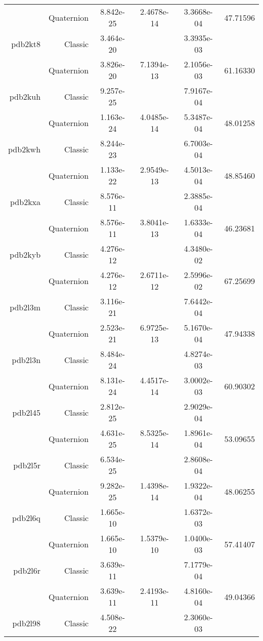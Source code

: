 \begin{xltabular}{\textwidth}{r|rS[table-format=1.3e+2]S[table-format=1.4e+2]S[table-format=1.4e+2]S[table-format=-1.5]}
& Quaternion & 8.842e-25 & 2.4678e-14 & 3.3668e-04 & 47.71596\\  \addlinespace
pdb2kt8 & Classic & 3.464e-20 &  & 3.3935e-03 & \\
& Quaternion & 3.826e-20 & 7.1394e-13 & 2.1056e-03 & 61.16330\\  \addlinespace
pdb2kuh & Classic & 9.257e-25 &  & 7.9167e-04 & \\
& Quaternion & 1.163e-24 & 4.0485e-14 & 5.3487e-04 & 48.01258\\  \addlinespace
pdb2kwh & Classic & 8.244e-23 &  & 6.7003e-04 & \\
& Quaternion & 1.133e-22 & 2.9549e-13 & 4.5013e-04 & 48.85460\\  \addlinespace
pdb2kxa & Classic & 8.576e-11 &  & 2.3885e-04 & \\
& Quaternion & 8.576e-11 & 3.8041e-13 & 1.6333e-04 & 46.23681\\  \addlinespace
pdb2kyb & Classic & 4.276e-12 &  & 4.3480e-02 & \\
& Quaternion & 4.276e-12 & 2.6711e-12 & 2.5996e-02 & 67.25699\\  \addlinespace
pdb2l3m & Classic & 3.116e-21 &  & 7.6442e-04 & \\
& Quaternion & 2.523e-21 & 6.9725e-13 & 5.1670e-04 & 47.94338\\  \addlinespace
pdb2l3n & Classic & 8.484e-24 &  & 4.8274e-03 & \\
& Quaternion & 8.131e-24 & 4.4517e-14 & 3.0002e-03 & 60.90302\\  \addlinespace
pdb2l45 & Classic & 2.812e-25 &  & 2.9029e-04 & \\
& Quaternion & 4.631e-25 & 8.5325e-14 & 1.8961e-04 & 53.09655\\  \addlinespace
pdb2l5r & Classic & 6.534e-25 &  & 2.8608e-04 & \\
& Quaternion & 9.282e-25 & 1.4398e-14 & 1.9322e-04 & 48.06255\\  \addlinespace
pdb2l6q & Classic & 1.665e-10 &  & 1.6372e-03 & \\
& Quaternion & 1.665e-10 & 1.5379e-10 & 1.0400e-03 & 57.41407\\  \addlinespace
pdb2l6r & Classic & 3.639e-11 &  & 7.1779e-04 & \\
& Quaternion & 3.639e-11 & 2.4193e-11 & 4.8160e-04 & 49.04366\\  \addlinespace
pdb2l98 & Classic & 4.508e-22 &  & 2.3060e-03 & \\

\end{xltabular}
